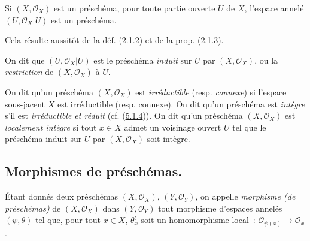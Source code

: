 \begin{proposition}[2.1.7]
\label{I.2.1.7-fr}
Si $(X,\mathscr{O}_X)$ est un préschéma, pour toute partie ouverte $U$ de $X$,
l'espace annelé $(U,\mathscr{O}_X|U)$ est un préschéma.
\end{proposition}

Cela résulte aussitôt de la déf. (\hyperref[I.2.1.2-fr]{2.1.2}) et de la prop.
(\hyperref[I.2.1.3-fr]{2.1.3}).

On dit que $(U,\mathscr{O}_X|U)$ est le préschéma \emph{induit} sur $U$ par
$(X,\mathscr{O}_X)$, ou la \emph{restriction} de $(X,\mathscr{O}_X)$ à $U$.

\begin{env}[2.1.8]
\label{I.2.1.8-fr}
On dit qu'un préschéma $(X,\mathscr{O}_X)$ est \emph{irréductible} (resp.
\emph{connexe}) si l'espace sous-jacent $X$ est irréductible (resp. connexe).
On dit qu'un préschéma est \emph{intègre} s'il est \emph{irréductible et
réduit} (cf. (\hyperref[I.5.1.4-fr]{5.1.4})). On dit qu'un préschéma
$(X,\mathscr{O}_X)$ est \emph{localement intègre} si tout $x\in X$ admet un
voisinage ouvert $U$ tel que le préschéma induit sur $U$ par
$(X,\mathscr{O}_X)$ soit intègre.
\end{env}

\subsection{Morphismes de préschémas.}
\label{subsection:I.2.2-fr}
\label{I.2.2-fr}

\begin{definition}[2.2.1]
\label{I.2.2.1-fr}
Étant donnés deux préschémas $(X,\mathscr{O}_X)$, $(Y,\mathscr{O}_Y)$, on
appelle \emph{morphisme (de préschémas)} de $(X,\mathscr{O}_X)$ dans
$(Y,\mathscr{O}_Y)$ tout morphisme d'espaces annelés $(\psi,\theta)$ tel que,
pour tout $x\in X$, $\theta_x^\sharp$ soit un homomorphisme local~:
$\mathscr{O}_{\psi(x)}\longrightarrow\mathscr{O}_x$.
\end{definition}

